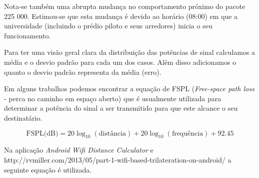 Nota-se também uma abrupta mudança no comportamento próximo do pacote 225 000.
Estimou-se que esta mudança é devido ao horário (08:00) em que a universidade
(incluindo o prédio piloto e seus arredores) inicia o seu funcionamento.

Para ter uma visão geral clara da distribuição das potências de sinal calculamos
a média e o desvio padrão para cada um dos casos. Além disso adicionamos o
quanto o desvio padrão representa da média (erro).

\begin{table}[htb]
\end{table}


Em alguns trabalhos podemos
encontrar a equação de FSPL (\emph{Free-space path loss} - perca no caminho em
espaço aberto) que é usualmente utilizada para determinar a potência do sinal
a ser transmitido para que este alcance o seu destinatário.

\begin{equation}
	{\mbox{FSPL(dB)}}=20\log _{{10}}(\text{distância})+20\log _{{10}}(\text{frequência})+92.45
\end{equation}

Na aplicação \emph{Android} \emph{Wifi Distance Calculator} \cite{Kuik2016} e
http://rvmiller.com/2013/05/part-1-wifi-based-trilateration-on-android/
a seguinte equação é utilizada.

